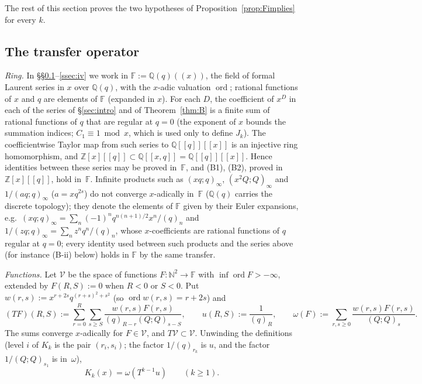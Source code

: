 \documentclass[11pt]{amsart}
\theoremstyle{definition}
\numberwithin{equation}{section}
\newcommand{\Z}{\mathbb{Z}}
\newcommand{\Q}{\mathbb{Q}}
\newcommand{\N}{\mathbb{N}}
\begin{document}
The rest of this section proves the two hypotheses of Proposition~\ref{prop:Fimplies} for every $k$.

\subsection{The transfer operator}\label{ssec:transfer}
\emph{Ring.} In §§\ref{ssec:transfer}--\ref{ssec:iv} we work in $\mathbb F:=\Q(q)((x))$, the field of formal
Laurent series in $x$ over $\Q(q)$, with the $x$-adic valuation $\operatorname{ord}$; rational functions of $x$ and
$q$ are elements of $\mathbb F$ (expanded in $x$). For each $D$, the coefficient of $x^D$ in each of the series of
§\ref{sec:intro} and of Theorem~\ref{thm:B} is a finite sum of rational functions of $q$ that are regular at $q=0$
(the exponent of $x$ bounds the summation indices; $C_1\equiv1\bmod x$, which is used only to define $J_k$). The
coefficientwise Taylor map from such series to $\Q[[q]][[x]]$ is an injective ring homomorphism, and
$\Z[x][[q]]\subset\Q[[x,q]]=\Q[[q]][[x]]$. Hence identities between these series may be proved in~$\mathbb F$, and
(B1), (B2), proved in $\Z[x][[q]]$, hold in~$\mathbb F$. Infinite products such as $(xq;q)_\infty$, $(x^2Q;Q)_\infty$ and
$1/(aq;q)_\infty$ ($a=xq^{2s}$) do not converge $x$-adically in~$\mathbb F$ ($\Q(q)$ carries the discrete topology); they
denote the elements of $\mathbb F$ given by their Euler expansions, e.g.\
$(xq;q)_\infty=\sum_n(-1)^nq^{n(n+1)/2}x^n/(q)_n$ and $1/(zq;q)_\infty=\sum_nz^nq^n/(q)_n$, whose $x$-coefficients are rational
functions of $q$ regular at $q=0$; every identity used between such products and the series above (for instance
(B-ii) below) holds in $\mathbb F$ by the same transfer.

\emph{Functions.} Let $\mathcal V$ be the space of functions $F\colon\N^2\to\mathbb F$ with
$\inf\operatorname{ord}F>-\infty$, extended by $F(R,S):=0$ when $R<0$ or $S<0$. Put
$w(r,s):=x^{r+2s}q^{(r+s)^2+s^2}$ (so $\operatorname{ord}w(r,s)=r+2s$) and
\[
(TF)(R,S):=\sum_{r=0}^R\sum_{s\ge S}\frac{w(r,s)F(r,s)}{(q)_{R-r}(Q;Q)_{s-S}},\qquad u(R,S):=\frac1{(q)_R},\qquad
\omega(F):=\sum_{r,s\ge0}\frac{w(r,s)F(r,s)}{(Q;Q)_s}.
\]
The sums converge $x$-adically for $F\in\mathcal V$, and $T\mathcal V\subset\mathcal V$. Unwinding the definitions
(level $i$ of $K_k$ is the pair $(r_i,s_i)$; the factor $1/(q)_{r_k}$ is $u$, and the factor $1/(Q;Q)_{s_1}$ is
in~$\omega$),
\begin{equation}\label{eq:Kop}
K_k(x)=\omega(T^{k-1}u)\qquad(k\ge1).
\end{equation}
\end{document}
